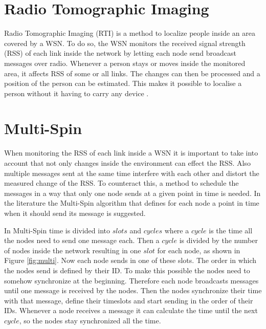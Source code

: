 

\section{Radio Tomographic Imaging}
Radio Tomographic Imaging (RTI) is a method to localize people inside an area covered by a WSN. To do so, the WSN monitors the received signal strength (RSS) of each link inside the network by letting each node send broadcast messages over radio. Whenever a person stays or moves inside the monitored area, it affects RSS of some or all links. The changes can then be processed and a position of the person can be estimated. This makes it possible to localise a person without it having to carry any device \cite{RtiMulti}.
\section{Multi-Spin}
When monitoring the RSS of each link inside a WSN it is important to take into account that not only changes inside the environment can effect the RSS. Also multiple messages sent at the same time interfere with each other and distort the measured change of the RSS. To counteract this, a method to schedule the messages in a way that only one node sends at a given point in time is needed. In the literature the Multi-Spin \cite{RtiMulti} algorithm that defines for each node a point in time when it should send its message is suggested.

In Multi-Spin time is divided into $slots$ and $cycles$ where a $cycle$ is the time all the nodes need to send one message each. Then a $cycle$ is divided by the number of nodes inside the network resulting in one $slot$ for each node, as shown in Figure \ref{fig:multi}. Now each node sends in one of these slots. The order in which the nodes send is defined by their ID. To make this possible the nodes need to somehow synchronize at the beginning. Therefore each node broadcasts messages until one message is received by the nodes. Then the nodes synchronize their time with that message, define their timeslots and start sending in the order of their IDs. Whenever a node receives a message it can calculate the time until the next $cycle$, so the nodes stay synchronized all the time.  \cite{RtiMulti}

